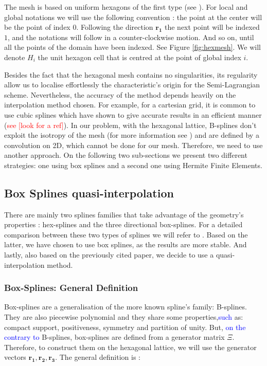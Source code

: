 \documentclass[proc]{edpsmath}
\begin{document}
The mesh is based on uniform hexagons of the first type (see \cite{Ulichney87}). For local and global notations we will use the following convention : the point at the center will be the point of index $0$. Following the direction $\mathbf{r_1}$ the next point will be indexed $1$, and the notations will follow in a counter-clockwise motion. And so on, until all the points of the domain have been indexed. See Figure \ref{fig:hexmesh}. We will denote $H_i$ the unit hexagon cell that is centred at the point of global index $i$.

Besides the fact that the hexagonal mesh contains no singularities, its regularity allow us to localise effortlessly the characteristic's origin for the Semi-Lagrangian scheme. Nevertheless, the accuracy of the method depends heavily on the interpolation method chosen. For example, for a cartesian grid, it is common to use cubic splines which have shown to give accurate results in an efficient manner (\textcolor{red}{see [look for a ref]}). In our problem, with the hexagonal lattice, B-splines don't exploit the isotropy of the mesh (for more information see \cite{Mersereau79-IEEE}) and are defined by a convolution on 2D, which cannot be done for our mesh. Therefore, we need to use another approach. On the following two sub-sections we present two different strategies: one using box splines and a second one using Hermite Finite Elements.


\subsection{Box Splines quasi-interpolation}

There are mainly two splines families that take advantage of the geometry's properties : hex-splines and the three directional box-splines. For a detailed comparison between these two types of splines we will refer to \cite{Condat2007}. Based on the latter, we have chosen to use box splines, as the results are more stable. And lastly, also based on the previously cited paper, we decide to use a quasi-interpolation method.

\subsubsection{Box-Splines: General Definition}

Box-splines are a generalisation of the more known spline's family: B-splines. They are also piecewise polynomial and they share some properties,\textcolor{blue}{such} as: compact support, positiveness, symmetry and partition of unity. But, \textcolor{blue}{on the contrary to} B-splines, box-splines are defined from a generator matrix $\Xi$. Therefore, to construct them on the hexagonal lattice, we will use the generator vectors $\mathbf{r_1, r_2, r_3}$. The general definition is \cite{Boor1993, Condat2006}:
\end{document}
